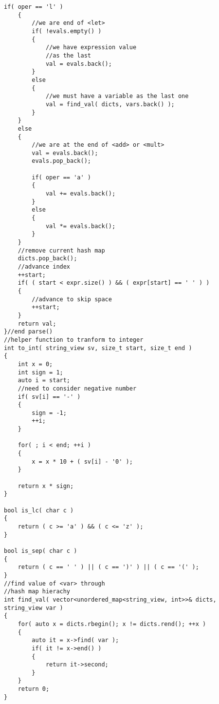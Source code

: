 \begin{lstlisting}[style=customc, caption={Recursive Parsing}]
    if( oper == 'l' )
    {
        //we are end of <let>
        if( !evals.empty() )
        {
            //we have expression value
            //as the last
            val = evals.back();
        }
        else
        {
            //we must have a variable as the last one
            val = find_val( dicts, vars.back() );
        }
    }
    else
    {
        //we are at the end of <add> or <mult>
        val = evals.back();
        evals.pop_back();

        if( oper == 'a' )
        {
            val += evals.back();
        }
        else
        {
            val *= evals.back();
        }
    }
    //remove current hash map
    dicts.pop_back();
    //advance index
    ++start;
    if( ( start < expr.size() ) && ( expr[start] == ' ' ) )
    {
        //advance to skip space
        ++start;
    }
    return val;
}//end parse()
//helper function to tranform to integer
int to_int( string_view sv, size_t start, size_t end )
{
    int x = 0;
    int sign = 1;
    auto i = start;
    //need to consider negative number
    if( sv[i] == '-' )
    {
        sign = -1;
        ++i;
    }

    for( ; i < end; ++i )
    {
        x = x * 10 + ( sv[i] - '0' );
    }

    return x * sign;
}

bool is_lc( char c )
{
    return ( c >= 'a' ) && ( c <= 'z' );
}

bool is_sep( char c )
{
    return ( c == ' ' ) || ( c == ')' ) || ( c == '(' );
}
//find value of <var> through
//hash map hierachy
int find_val( vector<unordered_map<string_view, int>>& dicts, string_view var )
{
    for( auto x = dicts.rbegin(); x != dicts.rend(); ++x )
    {
        auto it = x->find( var );
        if( it != x->end() )
        {
            return it->second;
        }
    }
    return 0;
}
\end{lstlisting}

